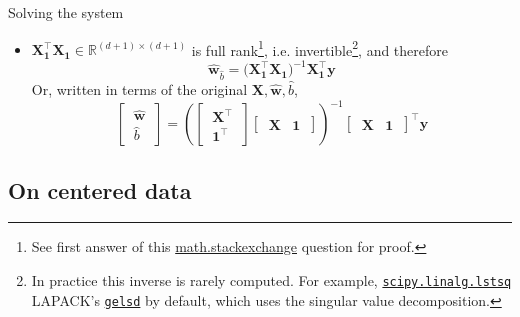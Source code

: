\documentclass{beamer}
\numberwithin{equation}{section}
\newcommand{\ahref}[2]{\href{#1}{\alert{#2}}}
\begin{document}
\begin{frame}{Solving the system}
\begin{itemize}
        \item
        $ \mathbf{X}_\mathbf{1}^\top\mathbf{X}_\mathbf{1} \in
        \mathbb{R}^{(d + 1) \times (d + 1)} $ is full rank\footnote{
            See first answer of this \ahref{
https://math.stackexchange.com/questions/349738/prove-operatornamerankata-operatornameranka-for-any-a-in-m-m-times-n}
            {math.stackexchange} question for proof.
        }, i.e. invertible\footnote{
            In practice this inverse is rarely computed. For example,
            \ahref{
https://docs.scipy.org/doc/scipy/reference/generated/scipy.linalg.lstsq.html
            }{\texttt{scipy.linalg.lstsq}} LAPACK's \ahref{
http://www.netlib.org/lapack/explore-html/db/d6a/dgelsd_8f.html
            }{\texttt{gelsd}} by default, which uses the singular value
            decomposition.
        },
        and therefore
        \begin{equation} \label{lr_ols_aug}
            \hat{\mathbf{w}}_{\hat{b}} = \big(
                \mathbf{X}_\mathbf{1}^\top\mathbf{X}_\mathbf{1}
            \big)^{-1}\mathbf{X}_\mathbf{1}^\top\mathbf{y}
        \end{equation}
        Or, written in terms of the original $ \mathbf{X}, \hat{\mathbf{w}},
        \hat{b} $,
        \begin{equation} \label{lr_ols_block}
            \begin{bmatrix}
                \ \hat{\mathbf{w}} \ \\ \ \hat{b} \
            \end{bmatrix} =
            \left(
                \begin{bmatrix}
                    \ \mathbf{X}^\top \ \\ \ \mathbf{1}^\top \
                \end{bmatrix}
                \begin{bmatrix}
                    \ \mathbf{X} & \mathbf{1} \
                \end{bmatrix}
            \right)^{-1}
            \begin{bmatrix}
                \ \mathbf{X} & \mathbf{1} \
            \end{bmatrix}^\top\mathbf{y}
        \end{equation}
    \end{itemize}
\end{frame}

\subsection{On centered data}
\end{document}
